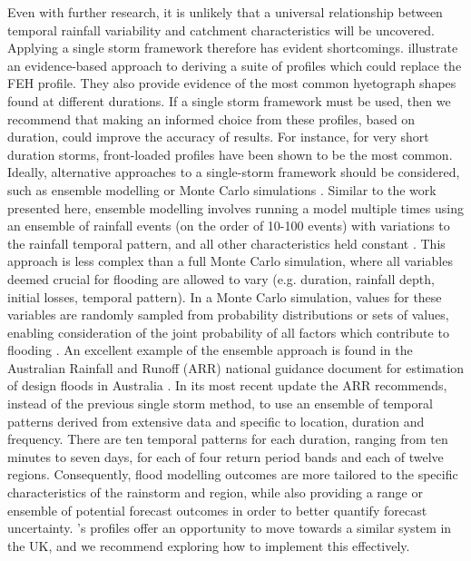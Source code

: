 \documentclass[APA,Times2COL]{WileyNJDv5}
\begin{document}
Even with further research, it is unlikely that a universal relationship between temporal rainfall variability and catchment characteristics will be uncovered. Applying a single storm framework therefore has evident shortcomings. \citet{villalobos2023towards} illustrate an evidence-based approach to deriving a suite of profiles which could replace the FEH profile. They also provide evidence of the most common hyetograph shapes found at different durations. If a single storm framework must be used, then we recommend that making an informed choice from these profiles, based on duration, could improve the accuracy of results. For instance, for very short duration storms, front-loaded profiles have been shown to be the most common. Ideally, alternative approaches to a single-storm framework should be considered, such as ensemble modelling or Monte Carlo simulations \citep{nathan2003use}. Similar to the work presented here, ensemble modelling involves running a model multiple times using an ensemble of rainfall events (on the order of 10-100 events) with variations to the rainfall temporal pattern, and all other characteristics held constant \citep{loveridge2018monte}. This approach is less complex than a full Monte Carlo simulation, where all variables deemed crucial for flooding are allowed to vary (e.g. duration, rainfall depth, initial losses, temporal pattern). In a Monte Carlo simulation, values for these variables are randomly sampled from probability distributions or sets of values, enabling consideration of the joint probability of all factors which contribute to flooding \citep{ball2019australian}. An excellent example of the ensemble approach is found in the Australian Rainfall and Runoff (ARR) national guidance document for estimation of design floods in Australia \citep{ball2019australian}. In its most recent update the ARR recommends, instead of the previous single storm method, to use an ensemble of temporal patterns derived from extensive data and specific to location, duration and frequency. There are ten temporal patterns for each duration, ranging from ten minutes to seven days, for each of four return period bands and each of twelve regions. Consequently, flood modelling outcomes are more tailored to the specific characteristics of the rainstorm and region, while also providing a range or ensemble of potential forecast outcomes in order to better quantify forecast uncertainty. \citet{villalobos2023towards}'s profiles offer an opportunity to move towards a similar system in the UK, and we recommend exploring how to implement this effectively.
\end{document}
